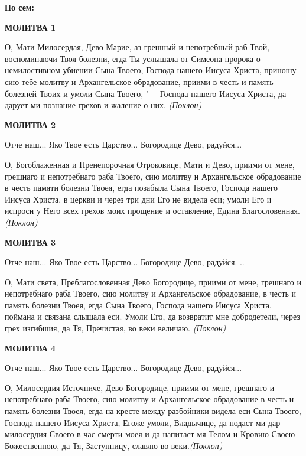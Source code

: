 \medskip


\bfseries По сем:\normalfont{}\nopagebreak


\medskip


\bfseries МОЛИТВА 1\normalfont{}\nopagebreak


О, Мати Милосердая, Дево Марие, аз грешный и непотребный раб Твой, воспоминаючи Твоя болезни, егда Ты услышала от Симеона пророка о немилостивном убиении Сына Твоего, Господа нашего Иисуса Христа, приношу сию тебе молитву и Архангельское обрадование, приими в честь и память болезней Твоих и умоли Сына Твоего, "--- Господа нашего Иисуса Христа, да дарует ми познание грехов и жаление о них. \itshape (Поклон)\normalfont{}


\medskip


\bfseries МОЛИТВА 2\normalfont{}\nopagebreak


Отче наш... Яко Твое есть Царство... Богородице Дево, радуйся...

О, Богоблаженная и Пренепорочная Отроковице, Мати и Дево, приими от мене, грешнаго и непотребнаго раба Твоего, сию молитву и Архангельское обрадование в честь памяти болезни Твоея, егда позабыла Сына Твоего, Господа нашего Иисуса Христа, в церкви и через три дни Его не видела еси; умоли Его и испроси у Него всех грехов моих прощение и оставление, Едина Благословенная. \itshape (Поклон)\normalfont{}


\medskip


\bfseries МОЛИТВА 3\normalfont{}\nopagebreak


Отче наш... Яко Твое есть Царство... Богородице Дево, радуйся. ..

О, Мати света, Преблагословенная Дево Богородице, приими от мене, грешнаго и непотребнаго раба Твоего, сию молитву и Архангельское обрадование, в честь и память болезни Твоея, егда Сына Твоего, Господа нашего Иисуса Христа, поймана и связана слышала еси. Умоли Его, да возвратит мне добродетели, через грех изгибшия, да Тя, Пречистая, во веки величаю. \itshape (Поклон)\normalfont{}


\medskip


\bfseries МОЛИТВА 4\normalfont{}\nopagebreak


Отче наш... Яко Твое есть Царство... Богородице Дево, радуйся...

О, Милосердия Источниче, Дево Богородице, приими от мене, грешнаго и непотребнаго раба Твоего, сию молитву и Архангельское обрадование в честь и память болезни Твоея, егда на кресте между разбойники видела еси Сына Твоего, Господа нашего Иисуса Христа, Егоже умоли, Владычице, да подаст ми дар милосердия Своего в час смерти моея и да напитает мя Телом и Кровию Своею Божественною, да Тя, Заступницу, славлю во веки.\itshape  (Поклон)\normalfont{}


